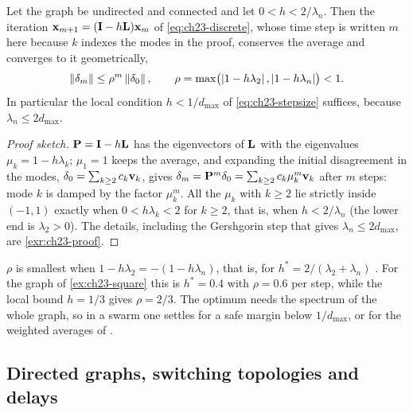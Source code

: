 \begin{theorem}
\label{thm:ch23-discrete}
Let the graph be undirected and connected and let $0 < h < 2/\lambda_n$.
Then the iteration $\mathbf{x}_{m+1} = (\mathbf{I} - h\mathbf{L})\mathbf{x}_m$ of
\cref{eq:ch23-discrete}, whose time step is written $m$ here because $k$
indexes the modes in the proof, conserves the average and converges to it geometrically,
\begin{equation}
  \left\lVert \mathbf{\delta}_m \right\rVert \le \rho^m \left\lVert \mathbf{\delta}_0 \right\rVert, \qquad
  \rho = \max\bigl(\left\lvert 1 - h\lambda_2 \right\rvert, \left\lvert 1 - h\lambda_n \right\rvert\bigr) < 1 .
  \label{eq:ch23-discreterate}
\end{equation}
In particular the local condition $h < 1/d_{\max}$ of
\cref{eq:ch23-stepsize} suffices, because $\lambda_n \le 2 d_{\max}$.
\end{theorem}
\begin{proof}[Proof sketch]
$\mathbf{P} = \mathbf{I} - h\mathbf{L}$ has the eigenvectors of $\mathbf{L}$ with the
eigenvalues $\mu_k = 1 - h\lambda_k$; $\mu_1 = 1$ keeps the average, and
expanding the initial disagreement in the modes, $\mathbf{\delta}_0 =
\sum_{k \ge 2} c_k \mathbf{v}_k$, gives $\mathbf{\delta}_m = \mathbf{P}^m
\mathbf{\delta}_0 = \sum_{k \ge 2} c_k \mu_k^m \mathbf{v}_k$ after $m$ steps: mode
$k$ is damped by the factor $\mu_k^m$. All the $\mu_k$ with $k \ge 2$ lie
strictly inside $(-1, 1)$ exactly when
$0 < h\lambda_k < 2$ for $k \ge 2$, that is, when $h < 2/\lambda_n$
(the lower end is $\lambda_2 > 0$). The details, including the Gershgorin
step that gives $\lambda_n \le 2d_{\max}$, are \cref{exr:ch23-proof}.
\end{proof}

\begin{remark}
\label{rem:ch23-beststep}
$\rho$ is smallest when $1 - h\lambda_2 = -(1 - h\lambda_n)$, that is,
for $h^* = 2/(\lambda_2 + \lambda_n)$ \cite{xiao2004fast}. For the graph of
\cref{ex:ch23-square} this is $h^* = 0.4$ with $\rho = 0.6$ per step, while
the local bound $h = 1/3$ gives $\rho = 2/3$. The optimum needs the spectrum
of the whole graph, so in a swarm one settles for a safe margin below
$1/d_{\max}$, or for the weighted averages of \textcite{xiao2004fast}.
\end{remark}

\subsection{Directed graphs, switching topologies and delays}
\label{sec:ch23-directed}

